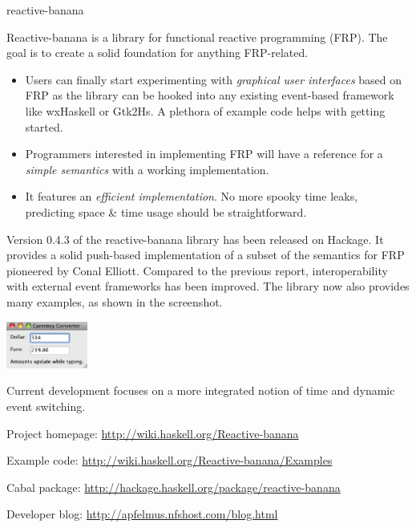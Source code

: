 \begin{hcarentry}[updated]{reactive-banana}
\makeheader

Reactive-banana is a library for functional reactive programming (FRP). The goal is to create a solid foundation for anything FRP-related.

\begin{itemize}
\item Users can finally start experimenting with \emph{graphical user interfaces} based on FRP as the library can be hooked into any existing event-based framework like wxHaskell or Gtk2Hs. A plethora of example code helps with getting started.
\item Programmers interested in implementing FRP will have a reference for a \emph{simple semantics} with a working implementation.
\item It features an \emph{efficient implementation}. No more spooky time leaks, predicting space \& time usage should be straightforward.
\end{itemize}

Version 0.4.3 of the reactive-banana library has been released on Hackage. It provides a solid push-based implementation of a subset of the semantics for FRP pioneered by Conal Elliott. Compared to the previous report, interoperability with external event frameworks has been improved. The library now also provides many examples, as shown in the screenshot.

\begin{center}
\includegraphics[width=0.2\textwidth]{html/hcar-reactive-banana-01.jpg}
\end{center}

Current development focuses on a more integrated notion of time and dynamic event switching.

\FurtherReading
\begin{compactitem}
\item Project homepage: \url{http://wiki.haskell.org/Reactive-banana}
\item Example code: \url{http://wiki.haskell.org/Reactive-banana/Examples}
\item Cabal package: \url{http://hackage.haskell.org/package/reactive-banana}
\item Developer blog:  \url{http://apfelmus.nfshost.com/blog.html}
\end{compactitem}
\end{hcarentry}

